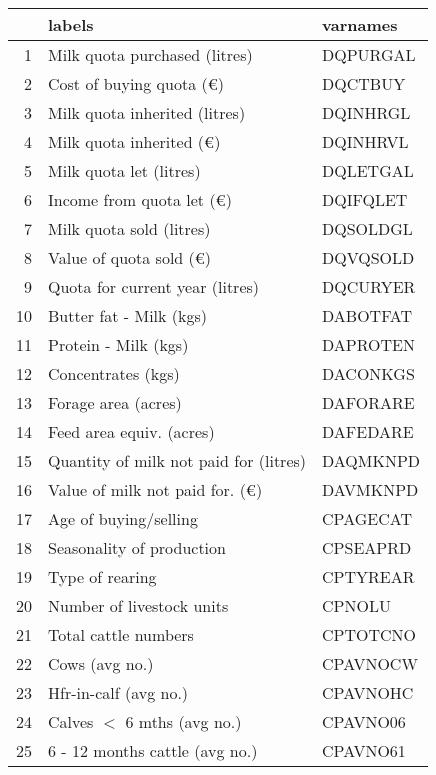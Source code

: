 \documentclass{article}\usepackage{graphicx, color}
\begin{document}
\begin{flushleft}
\newpage
\begin{table}[ht]
\begin{center}
\begin{tabular}{rll}
  \hline
 & labels & varnames \\ 
  \hline
1 & Milk quota purchased       (litres) & DQPURGAL \\ 
  2 & Cost of buying quota       (€) & DQCTBUY \\ 
  3 & Milk quota inherited       (litres) & DQINHRGL \\ 
  4 & Milk quota inherited       (€) & DQINHRVL \\ 
  5 & Milk quota let             (litres) & DQLETGAL \\ 
  6 & Income from quota let      (€) & DQIFQLET \\ 
  7 & Milk quota sold            (litres) & DQSOLDGL \\ 
  8 & Value of quota sold        (€) & DQVQSOLD \\ 
  9 & Quota for current year     (litres) & DQCURYER \\ 
  10 & Butter fat - Milk          (kgs) & DABOTFAT \\ 
  11 & Protein - Milk             (kgs) & DAPROTEN \\ 
  12 & Concentrates               (kgs) & DACONKGS \\ 
  13 & Forage area                (acres) & DAFORARE \\ 
  14 & Feed area equiv.           (acres) & DAFEDARE \\ 
  15 & Quantity of milk not paid for  (litres) & DAQMKNPD \\ 
  16 & Value of milk not paid for.    (€) & DAVMKNPD \\ 
  17 & Age of buying/selling & CPAGECAT \\ 
  18 & Seasonality of production & CPSEAPRD \\ 
  19 & Type of rearing & CPTYREAR \\ 
  20 & Number of livestock units & CPNOLU \\ 
  21 & Total cattle numbers & CPTOTCNO \\ 
  22 & Cows           (avg no.) & CPAVNOCW \\ 
  23 & Hfr-in-calf    (avg no.) & CPAVNOHC \\ 
  24 & Calves $<$ 6 mths       (avg no.) & CPAVNO06 \\ 
  25 & 6 - 12 months cattle  (avg no.) & CPAVNO61 \\ 

\end{tabular}
\end{center}
\end{table}
\end{flushleft}
\end{document}
